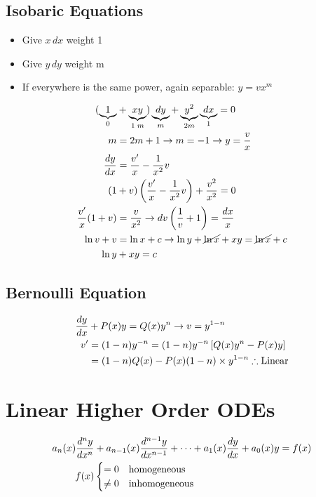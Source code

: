 \documentclass[Maths.tex]{subfiles}
\begin{document}
\subsection{Isobaric Equations}
\begin{itemize}
    \item Give $x\,dx$ weight 1
    \item Give $y\,dy$ weight m
    \item If everywhere is the same power, again separable: $y = vx^m$
\end{itemize}

\begin{align*}
    (\underbrace{1}_{0} &+ \underbrace{xy}_{1\;m})\underbrace{dy}_{m} + \underbrace{y^2}_{2m}\underbrace{dx}_{1} = 0 \\
    m &= 2m + 1 \to m = -1 \to y = \frac{v}{x} \\
    \frac{dy}{dx} &= \frac{v'}{x} - \frac{1}{x^2}v \\
    (1 &+ v)\left(\frac{v'}{x} - \frac{1}{x^2}v\right) + \frac{v^2}{x^2} = 0 \\
    \frac{v'}{x}(1 + v) &= \frac{v}{x^2} \to dv\left(\frac{1}{v} + 1\right) = \frac{dx}{x} \\
    \ln{v} + v &= \ln{x} + c \to \ln{y} + \cancel{\ln{x}} + xy = \cancel{\ln{x}} + c \\
    \ln{y} &+ xy = c
\end{align*}

\subsection{Bernoulli Equation}
\begin{align*}
    \frac{dy}{dx} &+ P(x)y = Q(x)y^n \to v = y^{1 - n} \\
    v' &= (1 - n)y^{-n} = (1 - n)y^{-n}\left[Q(x)y^n - P(x)y\right] \\
    &= (1-n)Q(x) - P(x)(1 - n) \times y^{1-n} \therefore \text{Linear}
\end{align*}

\section{Linear Higher Order ODEs}
\begin{align*}
    a_n(x)\frac{d^ny}{dx^n} &+ a_{n - 1}(x)\frac{d^{n-1}y}{dx^{n-1}} + \cdots + a_1(x)\frac{dy}{dx} + a_0(x)y = f(x) \\
    f(x) & \begin{cases} = 0 & \text{homogeneous} \\ \neq 0 & \text{inhomogeneous} \end{cases}
\end{align*}
\end{document}
